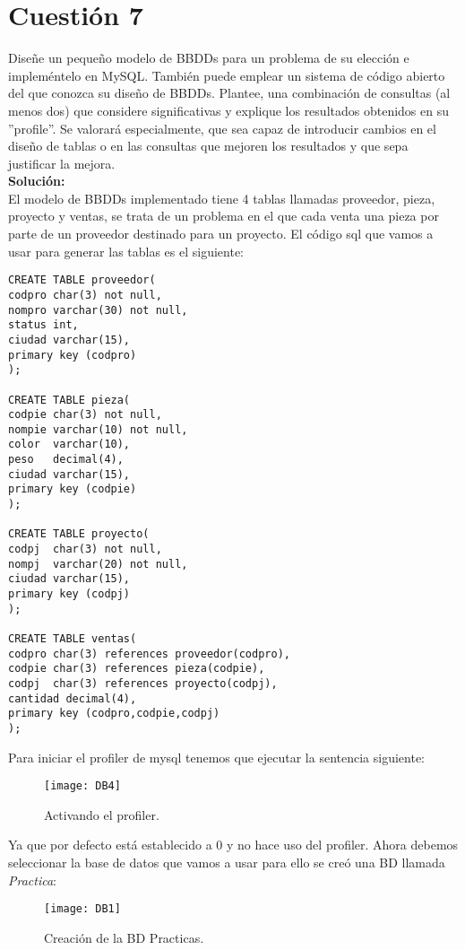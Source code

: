 \documentclass[a4paper, 10pt]{article} %
\begin{document}
\section{Cuestión 7}
Diseñe un pequeño modelo de BBDDs para un problema de su elección e impleméntelo en MySQL. También puede emplear un sistema de código abierto del que conozca su diseño de BBDDs. Plantee, una combinación de consultas (al menos dos) que considere significativas y explique los resultados obtenidos en su ''profile''. Se valorará especialmente, que sea capaz de introducir cambios en el diseño de tablas o en las consultas que mejoren los resultados y que sepa justificar la mejora.\\
\textbf{Solución:}\\
El modelo de BBDDs implementado tiene 4 tablas llamadas proveedor, pieza, proyecto y ventas, se trata de un problema en el que cada venta una pieza por parte de un proveedor destinado para un proyecto. El código sql que vamos a usar para generar las tablas es el siguiente:
\begin{verbatim}
CREATE TABLE proveedor(
codpro char(3) not null,
nompro varchar(30) not null,
status int,
ciudad varchar(15),
primary key (codpro)
);

CREATE TABLE pieza(
codpie char(3) not null,
nompie varchar(10) not null,
color  varchar(10),
peso   decimal(4),
ciudad varchar(15),
primary key (codpie)
);

CREATE TABLE proyecto(
codpj  char(3) not null,
nompj  varchar(20) not null,
ciudad varchar(15),
primary key (codpj)
);

CREATE TABLE ventas(
codpro char(3) references proveedor(codpro),
codpie char(3) references pieza(codpie),
codpj  char(3) references proyecto(codpj),
cantidad decimal(4),
primary key (codpro,codpie,codpj)
);
\end{verbatim}
Para iniciar el profiler de mysql tenemos que ejecutar la sentencia siguiente:
\begin{figure}[H]
\centering 
\texttt{[image: DB4]} 
\caption{Activando el profiler.} 
\label{contexto:figura} 
\end{figure}
Ya que por defecto está establecido a 0 y no hace uso del profiler. Ahora debemos seleccionar la base de datos que vamos a usar para ello se creó una BD llamada \textit{Practica}:
\begin{figure}[H]
\centering 
\texttt{[image: DB1]} 
\caption{Creación de la BD Practicas.} 
\label{contexto:figura} 
\end{figure}
\end{document}
